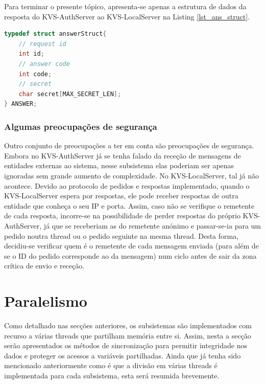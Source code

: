 Para terminar o presente tópico, apresenta-se apenas a estrutura de dados da resposta do KVS-AuthServer ao KVS-LocalServer na Listing \ref{lst_ans_struct}.
\begin{lstlisting}[language=C,label={lst_ans_struct},caption=Estrutura \texttt{ANS} para a comunicação do KVS-AuthServer para o KVS-LocalServer.]
typedef struct answerStruct{
    // request id
    int id;
    // answer code
    int code;
    // secret
    char secret[MAX_SECRET_LEN];
} ANSWER;
\end{lstlisting}

\subsubsection{Algumas preocupações de segurança}

Outro conjunto de preocupações a ter em conta são preocupações de segurança. Embora no KVS-AuthServer já se tenha falado da receção de mensagens de entidades externas ao sistema, nesse subsistema elas poderiam ser apenas ignoradas sem grande aumento de complexidade. No KVS-LocalServer, tal já não acontece. Devido ao protocolo de pedidos e respostas implementado, quando o KVS-LocalServer espera por respostas, ele pode receber respostas de outra entidade que conheça o seu IP e porta. Assim, caso não se verifique o remetente de cada resposta, incorre-se na possibilidade de perder respostas do próprio KVS-AuthServer, já que se receberiam as do remetente anónimo e passar-se-ia para um pedido noutra thread ou o pedido seguinte na mesma thread. Desta forma, decidiu-se verificar quem é o remetente de cada mensagem enviada (para além de se o ID do pedido corresponde ao da mensagem) num ciclo antes de sair da zona crítica de envio e receção.

\section{Paralelismo} \label{sec:synch}

Como detalhado nas secções anteriores, os subsistemas são implementados com recurso a várias threads que partilham memória entre si. Assim, nesta a secção serão apresentados os métodos de sincronização para permitir integridade nos dados e proteger os acessos a variáveis partilhadas. Ainda que já tenha sido mencionado anteriormente como é que a divisão em várias threads é implementada para cada subsistema, esta será resumida brevemente.

